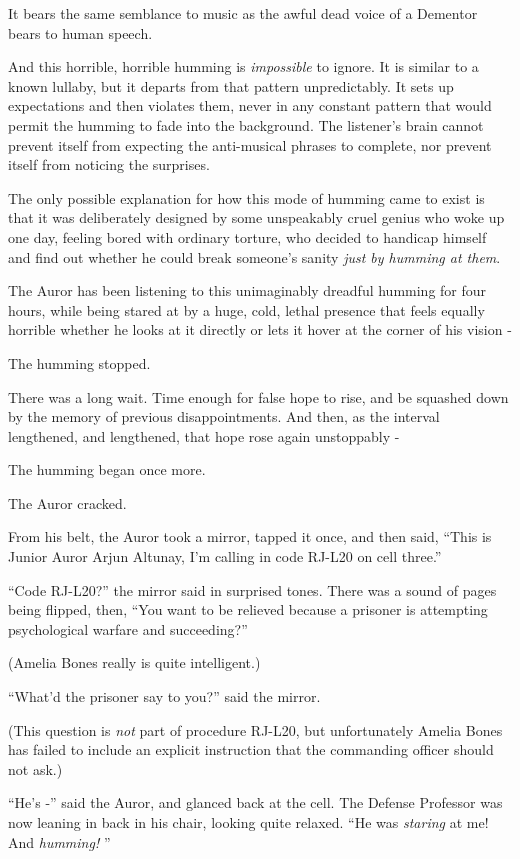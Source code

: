 It bears the same semblance to music as the awful dead voice of a
Dementor bears to human speech.

And this horrible, horrible humming is \emph{impossible} to ignore. It
is similar to a known lullaby, but it departs from that pattern
unpredictably. It sets up expectations and then violates them, never in
any constant pattern that would permit the humming to fade into the
background. The listener's brain cannot prevent itself from expecting
the anti-musical phrases to complete, nor prevent itself from noticing
the surprises.

The only possible explanation for how this mode of humming came to exist
is that it was deliberately designed by some unspeakably cruel genius
who woke up one day, feeling bored with ordinary torture, who decided to
handicap himself and find out whether he could break someone's sanity
\emph{just by humming at them}.

The Auror has been listening to this unimaginably dreadful humming for
four hours, while being stared at by a huge, cold, lethal presence that
feels equally horrible whether he looks at it directly or lets it hover
at the corner of his vision -

The humming stopped.

There was a long wait. Time enough for false hope to rise, and be
squashed down by the memory of previous disappointments. And then, as
the interval lengthened, and lengthened, that hope rose again
unstoppably -

The humming began once more.

The Auror cracked.

From his belt, the Auror took a mirror, tapped it once, and then said,
``This is Junior Auror Arjun Altunay, I'm calling in code RJ-L20 on cell
three.''

``Code RJ-L20?'' the mirror said in surprised tones. There was a sound
of pages being flipped, then, ``You want to be relieved because a
prisoner is attempting psychological warfare and succeeding?''

(Amelia Bones really is quite intelligent.)

``What'd the prisoner say to you?'' said the mirror.

(This question is \emph{not} part of procedure RJ-L20, but unfortunately
Amelia Bones has failed to include an explicit instruction that the
commanding officer should not ask.)

``He's -'' said the Auror, and glanced back at the cell. The Defense
Professor was now leaning in back in his chair, looking quite relaxed.
``He was \emph{staring} at me! And \emph{humming!} ''

